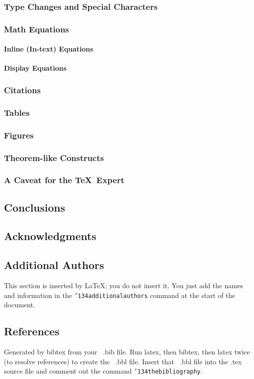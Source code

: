 \documentclass{sig-alternate}
\begin{document}
\subsubsection{Type Changes and  Special Characters}
\subsubsection{Math Equations}
\paragraph{Inline (In-text) Equations}
\paragraph{Display Equations}
\subsubsection{Citations}
\subsubsection{Tables}
\subsubsection{Figures}
\subsubsection{Theorem-like Constructs}
\subsubsection*{A Caveat for the \TeX\ Expert}
\subsection{Conclusions}
\subsection{Acknowledgments}
\subsection{Additional Authors}
This section is inserted by \LaTeX; you do not insert it.
You just add the names and information in the
\texttt{{\char'134}additionalauthors} command at the start
of the document.
\subsection{References}
Generated by bibtex from your ~.bib file.  Run latex,
then bibtex, then latex twice (to resolve references)
to create the ~.bbl file.  Insert that ~.bbl file into
the .tex source file and comment out
the command \texttt{{\char'134}thebibliography}.
\end{document}
